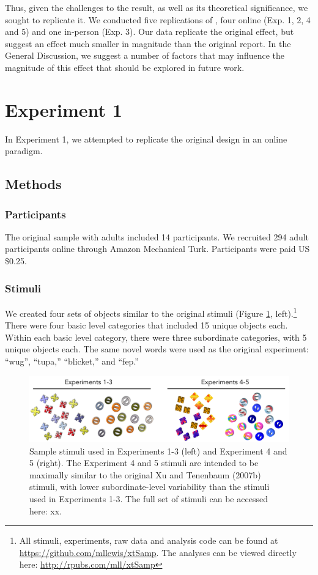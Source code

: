 \documentclass[man]{apa2}
\begin{document}

Thus, given the challenges to the  result, as well as its theoretical significance, we sought to replicate it. We conducted five replications of , four online (Exp. 1, 2,  4 and 5) and one in-person (Exp. 3). Our data replicate the original effect, but suggest an effect much smaller in magnitude than the original report. In the General Discussion, we suggest a number of factors that may influence the magnitude of this effect that should be explored in future work.
 
\section{Experiment 1} 
In Experiment 1, we attempted to replicate the original design in an online paradigm. 

\subsection{Methods}
\subsubsection{Participants} 
The original sample with adults included 14 participants. We recruited 294 adult participants online through Amazon Mechanical Turk. Participants were paid US \$0.25. 
\subsubsection{Stimuli}
We created four sets of objects similar to the original stimuli (Figure \ref{fig:stims}, left).\footnote{All stimuli, experiments, raw data and analysis code can be found at \url{https://github.com/mllewis/xtSamp}. The analyses can be viewed directly here: \url{http://rpubs.com/mll/xtSamp}} There were four basic level categories that included 15 unique objects each. Within each basic level category, there were three subordinate categories, with 5 unique objects each. The same novel words were used as the original experiment: ``wug'', ``tupa,'' ``blicket,'' and ``fep.''
\begin{figure}[t]
 \begin{center} 
 \includegraphics[width=5in]{figures/stims.png} 
 \caption{ \label{fig:stims} Sample stimuli used in Experiments 1-3 (left) and Experiment 4 and 5 (right). The Experiment 4 and 5 stimuli are intended to be maximally similar to the original Xu and Tenenbaum (2007b) stimuli, with lower subordinate-level variability than the stimuli used in Experiments 1-3. The full set of stimuli can be accessed here: xx. } 
 \end{center} 
\end{figure}	
 
\end{document}
